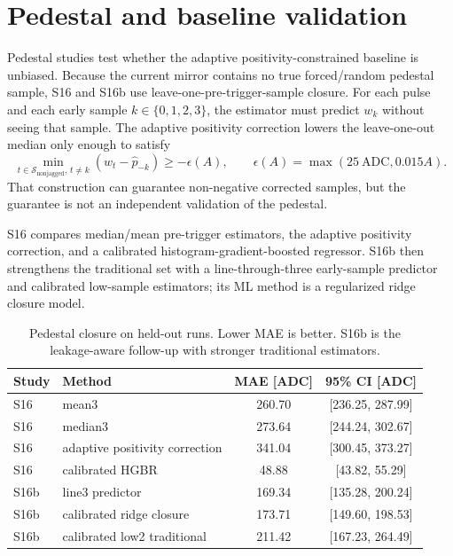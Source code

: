 \section{Pedestal and baseline validation}

Pedestal studies test whether the adaptive positivity-constrained baseline is
unbiased.  Because the current mirror contains no true forced/random pedestal
sample, S16 and S16b use leave-one-pre-trigger-sample closure.  For each pulse
and each early sample \(k\in\{0,1,2,3\}\), the estimator must predict
\(w_k\) without seeing that sample.  The adaptive positivity correction lowers
the leave-one-out median only enough to satisfy
\[
  \min_{t \in \mathcal{S}_{\mathrm{nonjagged}},\,t\ne k}
  \left(w_t-\hat{p}_{-k}\right) \geq -\epsilon(A),
  \qquad
  \epsilon(A)=\max(25\ \mathrm{ADC},0.015A).
\]
That construction can guarantee non-negative corrected samples, but the
guarantee is not an independent validation of the pedestal.

S16 compares median/mean pre-trigger estimators, the adaptive positivity
correction, and a calibrated histogram-gradient-boosted regressor.  S16b then
strengthens the traditional set with a line-through-three early-sample
predictor and calibrated low-sample estimators; its ML method is a regularized
ridge closure model.

\begin{table}[H]
\centering
\caption{Pedestal closure on held-out runs.  Lower MAE is better.  S16b is the
leakage-aware follow-up with stronger traditional estimators.}
\begin{tabular}{llcc}
\toprule
Study & Method & MAE [ADC] & 95\% CI [ADC] \\
\midrule
S16 & mean3 & 260.70 & [236.25, 287.99] \\
S16 & median3 & 273.64 & [244.24, 302.67] \\
S16 & adaptive positivity correction & 341.04 & [300.45, 373.27] \\
S16 & calibrated HGBR & 48.88 & [43.82, 55.29] \\
S16b & line3 predictor & 169.34 & [135.28, 200.24] \\
S16b & calibrated ridge closure & 173.71 & [149.60, 198.53] \\
S16b & calibrated low2 traditional & 211.42 & [167.23, 264.49] \\
\bottomrule
\end{tabular}
\label{tab:pedestal-closure}
\end{table}

